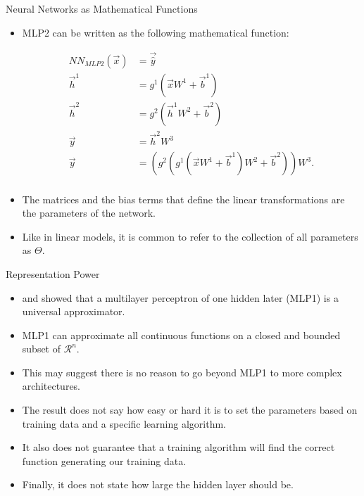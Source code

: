 \documentclass[handout]{beamer}
\begin{document}
\begin{frame}{Neural Networks as Mathematical Functions}
\begin{scriptsize}
\begin{itemize}
\item MLP2 can be written as the following mathematical function:
\begin{center}
\begin{equation}
\begin{split}
NN_{MLP2}(\vec{x}) & =  \vec{\hat{y}}  \\
\vec{h}^{1} &  = g^{1}(\vec{x}W^{1}+\vec{b}^{1}) \\
\vec{h}^{2} &  = g^{2}(\vec{h}^{1}W^{2}+\vec{b}^{2}) \\
\vec{y} &  = \vec{h}^{2}W^{3}\\
\vec{y} &  = (g^2(g^1(\vec{x}W^{1}+\vec{b}^{1})W^2+\vec{b}^2))W^3.\\
\end{split}
\end{equation}
\end{center}
\item The matrices and the bias terms that define the linear transformations are the parameters of the network. 
\item Like in linear models, it is common to refer to the collection of all parameters as $\Theta$.
\end{itemize}
\end{scriptsize}
\end{frame}



\begin{frame}{Representation Power}
\begin{scriptsize}
\begin{itemize}
\item \cite{hornik1989multilayer} and \cite{cybenko1989approximation} showed that a multilayer perceptron of one hidden later (MLP1) is a universal approximator.
\item MLP1 can approximate all continuous functions on a closed and bounded subset of $\mathcal{R}^n$.
\item This may suggest there is no reason to go beyond MLP1 to more complex architectures.
\item The result does not say how easy or hard it is to set the parameters based on training data and a specific learning algorithm.
\item It also does not guarantee that a training algorithm will find
the correct function generating our training data.
\item Finally, it does not state how large the hidden layer should be.
\end{itemize}


\end{scriptsize}
\end{frame}
\end{document}
